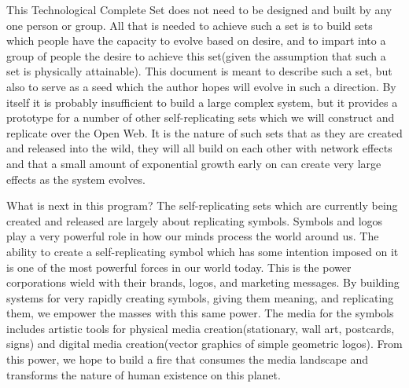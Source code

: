 \documentclass[12pt,a4paper]{amsart}
\numberwithin{equation}{section}
\begin{document}
This Technological Complete Set does not need to be designed and built
by any one person or group. All that is needed to achieve such a set is
to build sets which people have the capacity to evolve based on desire,
and to impart into a group of people the desire to achieve this
set(given the assumption that such a set is physically attainable). This
document is meant to describe such a set, but also to serve as a seed
which the author hopes will evolve in such a direction. By itself it is
probably insufficient to build a large complex system, but it provides a
prototype for a number of other self-replicating sets which we will
construct and replicate over the Open Web. It is the nature of such sets
that as they are created and released into the wild, they will all build
on each other with network effects and that a small amount of
exponential growth early on can create very large effects as the system
evolves.

What is next in this program? The self-replicating sets which are
currently being created and released are largely about replicating
symbols. Symbols and logos play a very powerful role in how our minds
process the world around us. The ability to create a self-replicating
symbol which has some intention imposed on it is one of the most
powerful forces in our world today. This is the power corporations wield
with their brands, logos, and marketing messages. By building systems
for very rapidly creating symbols, giving them meaning, and replicating
them, we empower the masses with this same power. The media for the
symbols includes artistic tools for physical media creation(stationary,
wall art, postcards, signs) and digital media creation(vector graphics
of simple geometric logos). From this power, we hope to build a fire
that consumes the media landscape and transforms the nature of human
existence on this planet.
\end{document}
